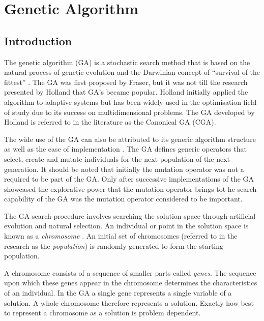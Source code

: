 \section{Genetic Algorithm}
\label{sec:geneticalgorithm}
\subsection{Introduction}
The genetic algorithm (GA) is a stochastic search method that is based on the natural process of genetic evolution and the Darwinian concept of ``survival of the fittest'' \cite{DistributedHierarchicalGA,AcceleratingGA,AdaptiveSAGA,FamilyGA}. The GA was first proposed by Fraser, but it was not till the research presented by Holland that GA's became popular\cite{CompuIntelligenceIntro}. Holland initially applied the algorithm to adaptive systems but has been widely used in the optimisation field of study due to its success on multidimensional problems\cite{ParallelGASA,DistributedHierarchicalGA,FamilyGA}. The GA developed by Holland is referred to in the literature as the Canonical GA (CGA)\cite{CompuIntelligenceIntro}.

The wide use of the GA can also be attributed to its generic algorithm structure as well as the ease of implementation \cite{FamilyGA,AdaptiveSAGA}. The GA defines generic operators that select, create and mutate individuals for the next population of the next generation\cite{CompuIntelligenceIntro}. It should be noted that initially the mutation operator was not a required to be part of the GA. Only after successive implementations of the GA showcased the explorative power that the mutation operator brings tot he search capability of the GA was the mutation operator considered to be important\cite{CompuIntelligenceIntro}. 


The GA search procedure involves searching the solution space through artificial evolution and natural selection\cite{FamilyGA,MultiPopGA,HybridIntelliGA}. An individual or point in the solution space is known as a \emph{chromosome} \cite{HumanPassiveGA}. An initial set of chromosomes (referred to in the research as the \emph{population}) is randomly generated to form the starting population\cite{FamilyGA,HybridIntelliGA,AcceleratingGA,MultiPopGA}. 

A chromosome consists of a sequence of smaller parts called \emph{genes}\cite{CompuIntelligenceIntro}. The sequence upon which these genes appear in the chromosome determines the characteristics of an individual\cite{CompuIntelligenceIntro}. In the GA a single gene represents a single variable of a solution\cite{FamilyGA,AcceleratingGA}. A whole chromosome therefore represents a solution\cite{FamilyGA,AcceleratingGA}. Exactly how best to represent a chromosome as a solution is problem dependent\cite{CompuIntelligenceIntro}.

